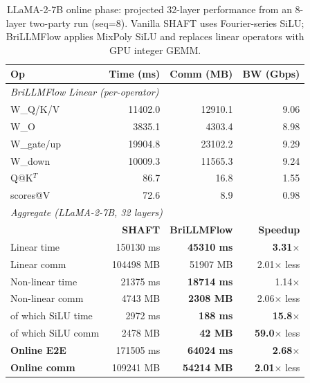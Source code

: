 \begin{table}[t]
\centering
\caption{LLaMA-2-7B online phase: projected 32-layer performance from an 8-layer two-party run (seq=8). Vanilla SHAFT uses Fourier-series SiLU; BriLLMFlow applies MixPoly SiLU and replaces linear operators with GPU integer GEMM.}
\label{tab:llama2_hybrid_comparison}
\setlength{\tabcolsep}{4pt}
\footnotesize
\begin{tabular}{lrrr}
\toprule
\textbf{Op} & \textbf{Time (ms)} & \textbf{Comm (MB)} & \textbf{BW (Gbps)} \\
\midrule
\multicolumn{4}{l}{\textit{BriLLMFlow Linear (per-operator)}} \\
W\_Q/K/V      & 11402.0 & 12910.1 & 9.06 \\
W\_O          & 3835.1 & 4303.4 & 8.98 \\
W\_gate/up    & 19904.8 & 23102.2 & 9.29 \\
W\_down       & 10009.3 & 11565.3 & 9.24 \\
Q@K$^T$       & 86.7 & 16.8 & 1.55 \\
scores@V      & 72.6 & 8.9 & 0.98 \\
\midrule
\multicolumn{4}{l}{\textit{Aggregate (LLaMA-2-7B, 32 layers)}} \\
                       & \textbf{SHAFT} & \textbf{BriLLMFlow} & \textbf{Speedup} \\
Linear time            & 150130 ms & \textbf{45310 ms} & \textbf{3.31}$\times$ \\
Linear comm            & 104498 MB & 51907 MB & 2.01$\times$ less \\
Non-linear time        & 21375 ms & \textbf{18714 ms} & 1.14$\times$ \\
Non-linear comm        & 4743 MB & \textbf{2308 MB} & 2.06$\times$ less \\
\quad of which SiLU time & 2972 ms & \textbf{188 ms} & \textbf{15.8}$\times$ \\
\quad of which SiLU comm & 2478 MB & \textbf{42 MB} & \textbf{59.0}$\times$ less \\
\midrule
\textbf{Online E2E}    & 171505 ms & \textbf{64024 ms} & \textbf{2.68}$\times$ \\
\textbf{Online comm}   & 109241 MB & \textbf{54214 MB} & \textbf{2.01}$\times$ less \\
\bottomrule
\end{tabular}
\end{table}
